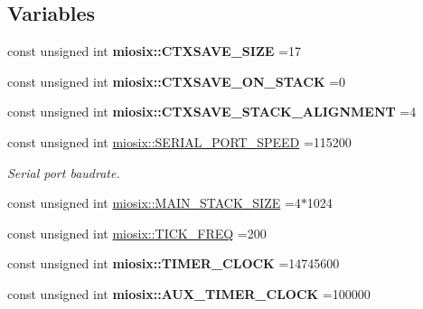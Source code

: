 \subsection*{Variables}
\begin{DoxyCompactItemize}
\item 
\hypertarget{group___settings_ga578154732b64fcf2588d6e9aa8d1c8b5}{const unsigned int {\bfseries miosix\-::\-C\-T\-X\-S\-A\-V\-E\-\_\-\-S\-I\-Z\-E} =17}\label{group___settings_ga578154732b64fcf2588d6e9aa8d1c8b5}

\item 
\hypertarget{group___settings_gadf6c1cc7c4a9b8ea984e92d2c8945a0e}{const unsigned int {\bfseries miosix\-::\-C\-T\-X\-S\-A\-V\-E\-\_\-\-O\-N\-\_\-\-S\-T\-A\-C\-K} =0}\label{group___settings_gadf6c1cc7c4a9b8ea984e92d2c8945a0e}

\item 
\hypertarget{group___settings_ga747d601c83f772bf30683b0feb947d49}{const unsigned int {\bfseries miosix\-::\-C\-T\-X\-S\-A\-V\-E\-\_\-\-S\-T\-A\-C\-K\-\_\-\-A\-L\-I\-G\-N\-M\-E\-N\-T} =4}\label{group___settings_ga747d601c83f772bf30683b0feb947d49}

\item 
\hypertarget{group___settings_ga20c40084a620833b1c2e21d3456d35e1}{const unsigned int \hyperlink{group___settings_ga20c40084a620833b1c2e21d3456d35e1}{miosix\-::\-S\-E\-R\-I\-A\-L\-\_\-\-P\-O\-R\-T\-\_\-\-S\-P\-E\-E\-D} =115200}\label{group___settings_ga20c40084a620833b1c2e21d3456d35e1}

\begin{DoxyCompactList}\small\item\em Serial port baudrate. \end{DoxyCompactList}\item 
const unsigned int \hyperlink{group___settings_ga78af1ac6f48bb21cdd8a6e51b26899a3}{miosix\-::\-M\-A\-I\-N\-\_\-\-S\-T\-A\-C\-K\-\_\-\-S\-I\-Z\-E} =4$\ast$1024
\item 
const unsigned int \hyperlink{group___settings_ga81e4cfce99dd185b6ada00ead4f39342}{miosix\-::\-T\-I\-C\-K\-\_\-\-F\-R\-E\-Q} =200
\item 
\hypertarget{group___settings_ga7168af7781e3dc7cee2a9362c6f75609}{const unsigned int {\bfseries miosix\-::\-T\-I\-M\-E\-R\-\_\-\-C\-L\-O\-C\-K} =14745600}\label{group___settings_ga7168af7781e3dc7cee2a9362c6f75609}

\item 
\hypertarget{group___settings_gaa28b40afbb96fb90673e83c2b9ac6105}{const unsigned int {\bfseries miosix\-::\-A\-U\-X\-\_\-\-T\-I\-M\-E\-R\-\_\-\-C\-L\-O\-C\-K} =100000}\label{group___settings_gaa28b40afbb96fb90673e83c2b9ac6105}


\end{DoxyCompactItemize}

